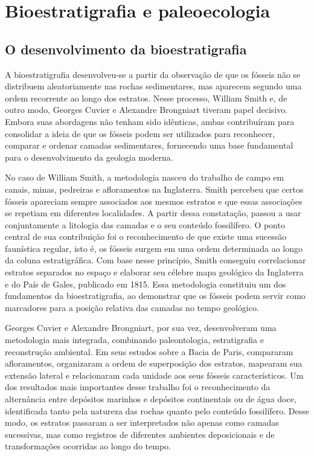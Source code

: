 \section{Bioestratigrafia e paleoecologia}

\subsection{O desenvolvimento da bioestratigrafia}

A bioestratigrafia desenvolveu-se a partir da observação de que os fósseis não se distribuem aleatoriamente nas rochas sedimentares, mas aparecem segundo uma ordem recorrente ao longo dos estratos. Nesse processo, William Smith e, de outro modo, Georges Cuvier e Alexandre Brongniart tiveram papel decisivo. Embora suas abordagens não tenham sido idênticas, ambas contribuíram para consolidar a ideia de que os fósseis podem ser utilizados para reconhecer, comparar e ordenar camadas sedimentares, fornecendo uma base fundamental para o desenvolvimento da geologia moderna.

No caso de William Smith, a metodologia nasceu do trabalho de campo em canais, minas, pedreiras e afloramentos na Inglaterra. Smith percebeu que certos fósseis apareciam sempre associados aos mesmos estratos e que essas associações se repetiam em diferentes localidades. A partir dessa constatação, passou a usar conjuntamente a litologia das camadas e o seu conteúdo fossilífero. O ponto central de sua contribuição foi o reconhecimento de que existe uma sucessão faunística regular, isto é, os fósseis surgem em uma ordem determinada ao longo da coluna estratigráfica. Com base nesse princípio, Smith conseguiu correlacionar estratos separados no espaço e elaborar seu célebre mapa geológico da Inglaterra e do País de Gales, publicado em 1815. Essa metodologia constituiu um dos fundamentos da bioestratigrafia, ao demonstrar que os fósseis podem servir como marcadores para a posição relativa das camadas no tempo geológico.

Georges Cuvier e Alexandre Brongniart, por sua vez, desenvolveram uma metodologia mais integrada, combinando paleontologia, estratigrafia e reconstrução ambiental. Em seus estudos sobre a Bacia de Paris, compararam afloramentos, organizaram a ordem de superposição dos estratos, mapearam sua extensão lateral e relacionaram cada unidade aos seus fósseis característicos. Um dos resultados mais importantes desse trabalho foi o reconhecimento da alternância entre depósitos marinhos e depósitos continentais ou de água doce, identificada tanto pela natureza das rochas quanto pelo conteúdo fossilífero. Desse modo, os estratos passaram a ser interpretados não apenas como camadas sucessivas, mas como registros de diferentes ambientes deposicionais e de transformações ocorridas ao longo do tempo.

